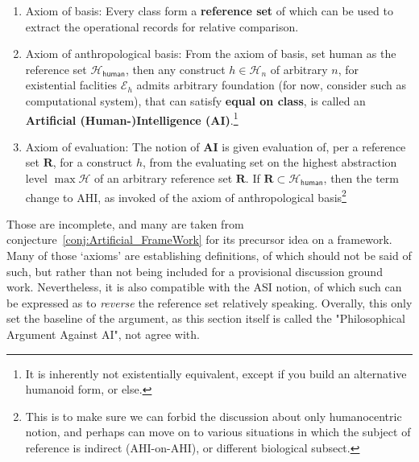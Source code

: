 \begin{note}
\begin{enumerate}[topsep=1pt,itemsep=1pt]
        \item Axiom of basis: Every class form a \textbf{reference set} of which can be used to extract the operational records for relative comparison. 
        \item Axiom of anthropological basis: From the axiom of basis, set human as the reference set $\mathcal{H}_{\mathsf{human}}$, then any construct $h\in \mathcal{H}_{n}$ of arbitrary $n$, for existential faclities $\mathcal{E}_{h}$ admits arbitrary foundation (for now, consider such as computational system), that can satisfy \textbf{equal on class}, is called an \textbf{Artificial (Human-)Intelligence (AI)}.\footnote{It is inherently not existentially equivalent, except if you build an alternative humanoid form, or else.}
        \item Axiom of evaluation: The notion of \textbf{AI} is given evaluation of, per a reference set $\mathbf{R}$, for a construct $h$, from the evaluating set on the highest abstraction level $\max \mathcal{H}$ of an arbitrary reference set $\mathbf{R}$. If $\mathbf{R}\subset \mathcal{H}_{\mathsf{human}}$, then the term change to AHI, as invoked of the axiom of anthropological basis\footnote{This is to make sure we can forbid the discussion about only humanocentric notion, and perhaps can move on to various situations in which the subject of reference is indirect (AHI-on-AHI), or different biological subsect.}
    \end{enumerate}
\end{note}

Those are incomplete, and many are taken from conjecture~\ref{conj:Artificial_FrameWork} for its precursor idea on a framework. Many of those `axioms' are establishing definitions, of which should not be said of such, but rather than not being included for a provisional discussion ground work. Nevertheless, it is also compatible with the ASI notion, of which such can be expressed as to \textit{reverse} the reference set relatively speaking. Overally, this only set the baseline of the argument, as this section itself is called the "Philosophical Argument Against AI", not agree with.  

